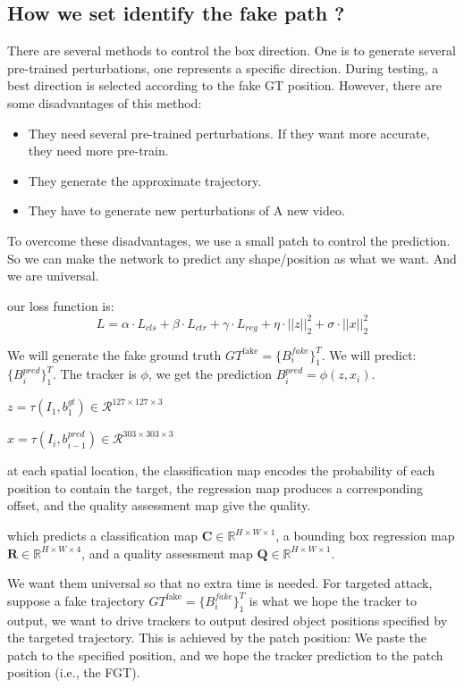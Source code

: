 \documentclass{article}
\begin{document}
\subsection{How we set identify the fake path ?}

There are several methods to control the box direction. One is to generate several pre-trained perturbations, one represents a specific direction. During testing, a best direction is selected according to the fake GT position. However, there are some disadvantages of this method:
\begin{itemize}
\item They need several pre-trained perturbations. If they want more accurate, they need more pre-train.
\item They generate the approximate trajectory.
\item They have to generate  new perturbations of A new video.
\end{itemize}
To overcome these disadvantages, we use a small patch to control the prediction. So we can make the network to predict any shape/position as what we want. And we are universal.

our loss function is:
\begin{equation}
L = \alpha \cdot L_{cls} + \beta \cdot L_{ctr} +  \gamma \cdot L_{reg} + \eta \cdot ||z||_2^2 +  \sigma \cdot ||x||^2_2
\end{equation}

We will generate the fake ground truth $GT^{\text{fake}}=\{B^{fake}_i\}_1^T$.
We will predict: $\{B^{pred}_i\}_1^T$.
The tracker is $\phi$, we get the prediction $B_i^{pred}=\phi(z, x_i)$.

$z = \tau (I_1, b^{gt}_1)\in \mathcal{R}^{127\times 127\times 3}$

$x = \tau(I_i, b_{i-1}^{pred})\in \mathcal{R}^{303\times 303 \times 3}$

at each spatial location, the classification map encodes the probability of each position to contain the target, the regression map produces a corresponding offset, and the quality assessment map give the quality. 

which predicts a classification map $\textbf{C}\in \mathbb{R}^{H\times W\times 1}$, a bounding box regression map $\textbf{R}\in \mathbb{R}^{H\times W\times 4}$, and a quality assessment map $\textbf{Q}\in \mathbb{R}^{H\times W\times 1}$.

We want them universal so that no extra time is needed.
For targeted attack, suppose a fake trajectory $GT^{\text{fake}}=\{B^{fake}_i\}_1^T$ is what we hope the tracker to output, we want to drive trackers to output desired object positions specified by the targeted trajectory. This is achieved by the patch position: We paste the patch to the specified position, and we hope the tracker prediction to the patch position (i.e., the FGT).
\end{document}
